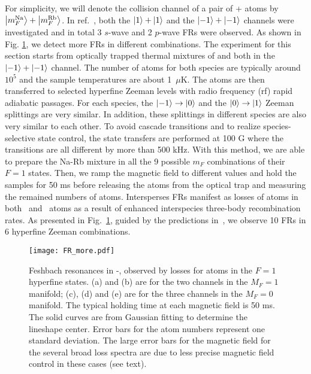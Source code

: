 For simplicity, we will denote the collision channel of a pair of \Na + \Rb atoms by $\ket{m_F^{\rm Na}}+\ket{m_F^{\rm Rb}}$. In ref.~\cite{wang2013observation}, both the $\ket{1}+\ket{1}$ and the $\ket{-1}+\ket{-1}$ channels were investigated and in total 3 $s$-wave and 2 $p$-wave FRs were observed. As shown in Fig. \ref{FR_more}, we detect more FRs in different combinations. The experiment for this section starts from optically trapped thermal mixtures of \Na and \Rb both in the $\ket{-1}+\ket{-1}$ channel. The number of atoms for both species are typically around $10^5$ and the sample temperatures are about 1~$\mu$K. The atoms are then transferred to selected hyperfine Zeeman levels with radio frequency (rf) rapid adiabatic passages. For each species, the $\ket{-1}\rightarrow \ket{0}$ and the $\ket{0}\rightarrow \ket{1}$ Zeeman splittings are very similar. In addition, these splittings in different species are also very similar to each other. To avoid cascade transitions and to realize species-selective state control, the state transfers are performed at 100 G where the transitions are all different by more than 500 kHz. With this method, we are able to prepare the Na-Rb mixture in all the 9 possible $m_F$ combinations of their $F = 1$ states. Then, we ramp the magnetic field to different values and hold the samples for 50 ms before releasing the atoms from the optical trap and measuring the remained numbers of atoms. Intersperses FRs manifest as losses of atoms in both \Na~and \Rb~atoms as a result of enhanced interspecies three-body recombination rates. As presented in Fig.~\ref{FR_more}, guided by the predictions in~\cite{wang2013observation}, we observe 10 FRs in 6 hyperfine Zeeman combinations. 

\begin{figure}[htb]
\begin{center}
\texttt{[image: FR\_more.pdf]}
\end{center}
\caption[Loss spectroscopy of Feshbach resonance with different spin combinations]{Feshbach resonances in \Na-\Rb, observed by losses for atoms in the $F = 1$ hyperfine states. (a) and (b) are for the two channels in the $M_F = 1$ manifold; (c), (d) and (e) are for the three channels in the $M_F = 0$ manifold. The typical holding time at each magnetic field is 50 ms. The solid curves are from Gaussian fitting to determine the lineshape center. Error bars for the atom numbers represent one standard deviation. The large error bars for the magnetic field for the several broad loss spectra are due to less precise magnetic field control in these cases (see text).}
\label{FR_more}
\end{figure}

